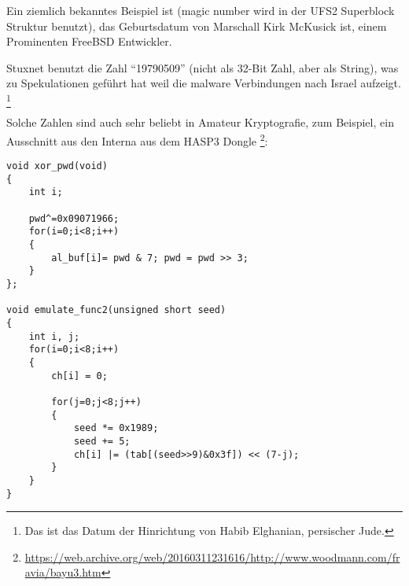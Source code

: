 
Ein ziemlich bekanntes Beispiel ist   (magic number wird in der UFS2 Superblock Struktur benutzt), das 
Geburtsdatum von Marschall Kirk McKusick ist, einem Prominenten FreeBSD Entwickler. 



Stuxnet benutzt die Zahl ``19790509'' (nicht als 32-Bit Zahl, aber als String), was zu Spekulationen geführt hat
weil die malware Verbindungen nach Israel aufzeigt.
\footnote{Das ist das Datum der Hinrichtung von Habib Elghanian, persischer Jude.}

Solche Zahlen sind auch sehr beliebt in Amateur Kryptografie, zum Beispiel, ein Ausschnitt aus den  Interna aus dem HASP3 Dongle %
\footnote{\url{https://web.archive.org/web/20160311231616/http://www.woodmann.com/fravia/bayu3.htm}}:

\begin{lstlisting}[style=customc]
void xor_pwd(void) 
{ 
	int i; 
	
	pwd^=0x09071966;
	for(i=0;i<8;i++) 
	{ 
		al_buf[i]= pwd & 7; pwd = pwd >> 3; 
	} 
};

void emulate_func2(unsigned short seed)
{ 
	int i, j; 
	for(i=0;i<8;i++) 
	{ 
		ch[i] = 0; 
		
		for(j=0;j<8;j++)
		{ 
			seed *= 0x1989; 
			seed += 5; 
			ch[i] |= (tab[(seed>>9)&0x3f]) << (7-j); 
		}
	} 
}
\end{lstlisting}

